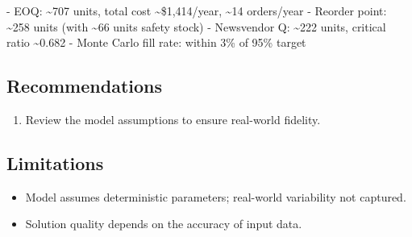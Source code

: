 \documentclass[11pt, a4paper]{article}
\begin{document}
- EOQ: \textasciitilde{}707 units, total cost \textasciitilde{}\$1,414/year, \textasciitilde{}14 orders/year
- Reorder point: \textasciitilde{}258 units (with \textasciitilde{}66 units safety stock)
- Newsvendor Q: \textasciitilde{}222 units, critical ratio \textasciitilde{}0.682
- Monte Carlo fill rate: within 3\% of 95\% target



\subsection{Recommendations}

\begin{enumerate}
  \item Review the model assumptions to ensure real-world fidelity.
\end{enumerate}

\subsection{Limitations}

\begin{polyawarnbox}
\begin{itemize}
  \item Model assumes deterministic parameters; real-world variability not captured.
  \item Solution quality depends on the accuracy of input data.
\end{itemize}
\end{polyawarnbox}

\end{document}
